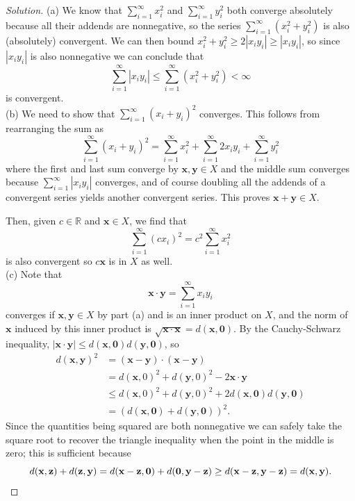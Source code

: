 \documentclass[10pt]{article}
\providecommand{\RR}{\mathbb R}
\providecommand{\mb}[1]{\mathbf{#1}}
\newenvironment{soln}{\begin{proof}[Solution]}{\end{proof}}
\providecommand{\abs}[1]{\left|#1\right|}
\begin{document}
\begin{soln}
    (a) We know that $\sum_{i=1}^\infty x_i^2$ and $\sum_{i=1}^\infty y_i^2$
    both converge absolutely because all their addends are nonnegative,
    so the series $\sum_{i=1}^\infty (x_i^2 + y_i^2)$ is also (absolutely) convergent.
    We can then bound $x_i^2 + y_i^2 \ge 2\abs{x_iy_i} \ge \abs{x_iy_i}$,
    so since $\abs{x_iy_i}$ is also nonnegative we can conclude that
    \begin{equation*}
	\sum_{i=1}^\infty \abs{x_iy_i}\le\sum_{i=1}^\infty (x_i^2+y_i^2)<\infty
    \end{equation*}
    is convergent.
    \\

    (b) We need to show that $\sum_{i=1}^\infty (x_i+y_i)^2$ converges.
    This follows from rearranging the sum as
    \begin{equation*}
	\sum_{i=1}^\infty (x_i + y_i)^2 =
	\sum_{i=1}^\infty x_i^2 + \sum_{i=1}^\infty 2x_iy_i + \sum_{i=1}^\infty y_i^2
    \end{equation*}
    where the first and last sum converge by $\mb x,\mb y\in X$
    and the middle sum converges because $\sum_{i=1}^\infty \abs{x_iy_i}$
    converges, and of course doubling all the addends of a convergent series
    yields another convergent series.
    This proves $\mb x+\mb y\in X$.

    Then, given $c\in\RR$ and $\mb x\in X$, we find that
    \begin{equation*}
	\sum_{i=1}^\infty (cx_i)^2 = c^2\sum_{i=1}^\infty x_i^2
    \end{equation*}
    is also convergent so $c\mb x$ is in $X$ as well.
    \\

    (c) Note that
    \begin{equation*}
	\mb x\cdot \mb y = \sum_{i=1}^\infty x_iy_i
    \end{equation*}
    converges if $\mb x,\mb y\in X$ by part (a)
    and is an inner product on $X$, and the norm of $\mb x$
    induced by this inner product is $\sqrt{\mb x\cdot \mb x} = d(\mb x,\mb 0)$.
    By the Cauchy-Schwarz inequality,
    $\abs{\mb x\cdot\mb y}\le d(\mb x,\mb 0)d(\mb y,\mb 0)$, so
    \begin{align*}
	d(\mb x,\mb y)^2
	&= (\mb x-\mb y)\cdot(\mb x-\mb y)\\
	&= d(\mb x,0)^2 + d(\mb y,0)^2 - 2\mb x\cdot \mb y\\
	&\le d(\mb x,0)^2 + d(\mb y,0)^2 + 2d(\mb x,\mb 0)d(\mb y,\mb 0)\\
	&= (d(\mb x,\mb 0) + d(\mb y,\mb 0))^2.
    \end{align*}
    Since the quantities being squared are both nonnegative
    we can safely take the square root to recover the triangle inequality
    when the point in the middle is zero;
    this is sufficient because
    \begin{equation*}
	d(\mb x,\mb z) + d(\mb z,\mb y) =
	d(\mb x-\mb z,\mb0) + d(\mb0,\mb y-\mb z)
	\ge d(\mb x-\mb z,\mb y-\mb z) = d(\mb x,\mb y).\qedhere
    \end{equation*}
\end{soln}
\end{document}
